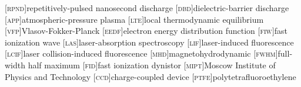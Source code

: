 [\textsc{rpnd}]{repetitively-pulsed nanosecond discharge}
[\textsc{dbd}]{dielectric-barrier discharge}
[\textsc{app}]{atmospheric-pressure plasma}
[\textsc{lte}]{local thermodynamic equilibrium}
[\textsc{vfp}]{Vlasov-Fokker-Planck}
[\textsc{eedf}]{electron energy distribution function}
[\textsc{fiw}]{fast ionization wave}
[\textsc{las}]{laser-absorption spectroscopy}
[\textsc{lif}]{laser-induced fluorescence}
[\textsc{lcif}]{laser collision-induced fluorescence}
[\textsc{mhd}]{magnetohydrodynamic}
[\textsc{fwhm}]{full-width half maximum}
[\textsc{fid}]{fast ionization dynistor}
[\textsc{mipt}]{Moscow Institute of Physics and Technology}
[\textsc{ccd}]{charge-coupled device}
[\textsc{ptfe}]{polytetrafluoroethylene}

